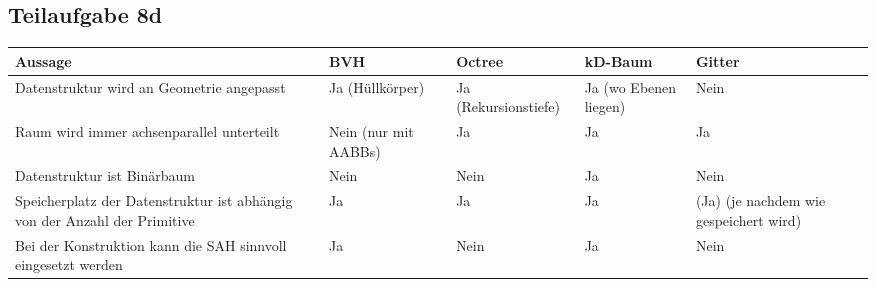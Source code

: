 \documentclass[a4paper]{scrartcl}
\begin{document}
\subsection*{Teilaufgabe 8d}
\begin{tabular}{p{4cm}p{2.2cm}p{2.2cm}p{2.2cm}p{2.2cm}}\toprule
Aussage                                                                 & BVH             & Octree               & kD-Baum               & Gitter               \\\midrule
Datenstruktur wird an Geometrie angepasst                               & Ja (Hüllkörper) & Ja (Rekursionstiefe) & Ja (wo Ebenen liegen) & Nein \\
Raum wird immer achsen\-parallel unterteilt                             & Nein (nur mit AABBs)            & Ja                   & Ja                    & Ja                   \\
Datenstruktur ist Binär\-baum\footnotemark                              & Nein            & Nein                 & Ja                    & Nein                 \\
Speicherplatz der Daten\-struktur ist abhängig von der Anzahl der Primitive & Ja            & Ja                   & Ja                    & (Ja) (je nachdem wie gespeichert wird)                  \\
Bei der Konstruktion kann die SAH sinnvoll eingesetzt werden            & Ja\footnotemark & Nein                 & Ja                    & Nein                 \\\bottomrule
\end{tabular}
\end{document}
